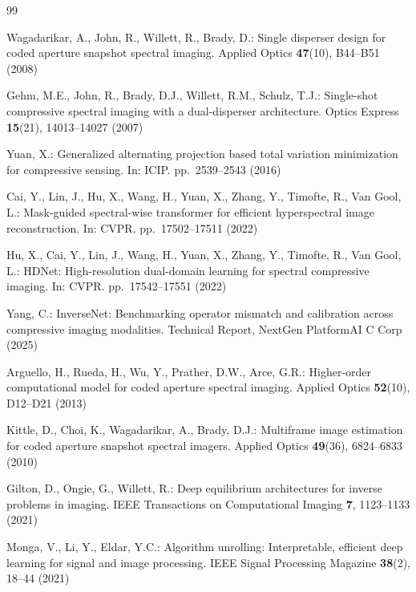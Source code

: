 \documentclass[runningheads]{llncs}
\begin{document}

\begin{thebibliography}{99}

Wagadarikar, A., John, R., Willett, R., Brady, D.:
Single disperser design for coded aperture snapshot spectral imaging.
Applied Optics \textbf{47}(10), B44--B51 (2008)

Gehm, M.E., John, R., Brady, D.J., Willett, R.M., Schulz, T.J.:
Single-shot compressive spectral imaging with a dual-disperser architecture.
Optics Express \textbf{15}(21), 14013--14027 (2007)

Yuan, X.:
Generalized alternating projection based total variation minimization for compressive sensing.
In: ICIP. pp.~2539--2543 (2016)

Cai, Y., Lin, J., Hu, X., Wang, H., Yuan, X., Zhang, Y., Timofte, R., Van Gool, L.:
Mask-guided spectral-wise transformer for efficient hyperspectral image reconstruction.
In: CVPR. pp.~17502--17511 (2022)

Hu, X., Cai, Y., Lin, J., Wang, H., Yuan, X., Zhang, Y., Timofte, R., Van Gool, L.:
HDNet: High-resolution dual-domain learning for spectral compressive imaging.
In: CVPR. pp.~17542--17551 (2022)

Yang, C.:
InverseNet: Benchmarking operator mismatch and calibration across compressive imaging modalities.
Technical Report, NextGen PlatformAI C Corp (2025)

Arguello, H., Rueda, H., Wu, Y., Prather, D.W., Arce, G.R.:
Higher-order computational model for coded aperture spectral imaging.
Applied Optics \textbf{52}(10), D12--D21 (2013)

Kittle, D., Choi, K., Wagadarikar, A., Brady, D.J.:
Multiframe image estimation for coded aperture snapshot spectral imagers.
Applied Optics \textbf{49}(36), 6824--6833 (2010)

Gilton, D., Ongie, G., Willett, R.:
Deep equilibrium architectures for inverse problems in imaging.
IEEE Transactions on Computational Imaging \textbf{7}, 1123--1133 (2021)

Monga, V., Li, Y., Eldar, Y.C.:
Algorithm unrolling: Interpretable, efficient deep learning for signal and image processing.
IEEE Signal Processing Magazine \textbf{38}(2), 18--44 (2021)


\end{thebibliography}
\end{document}
